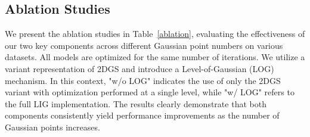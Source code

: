 \subsection{Ablation Studies}
We present the ablation studies in Table~\ref{ablation}, evaluating the effectiveness of our two key components across different Gaussian point numbers on various datasets. All models are optimized for the same number of iterations. We utilize a variant representation of 2DGS and introduce a Level-of-Gaussian (LOG) mechanism. In this context, "w/o LOG" indicates the use of only the 2DGS variant with optimization performed at a single level, while "w/ LOG" refers to the full LIG implementation. The results clearly demonstrate that both components consistently yield performance improvements as the number of Gaussian points increases.

\begin{table}[t]
  \centering
  \caption{\textbf{Ablation studies on three datasets.} We evaluate the effectiveness of our two distinct designs compared to GaussianImage. Across various settings of Gaussian points, our designs consistently bring performance improvements.}
  \label{ablation}
\end{table}


